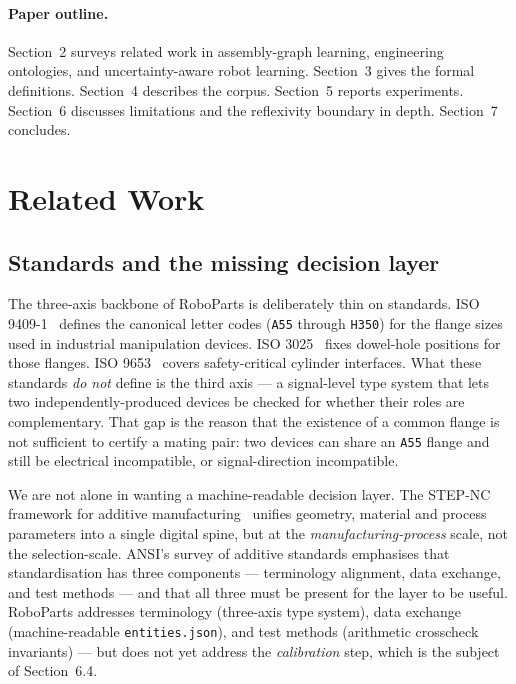 \documentclass[review]{elsarticle}
\begin{document}
\paragraph{Paper outline.}
Section~2 surveys related work in assembly-graph learning, engineering
ontologies, and uncertainty-aware robot learning. Section~3 gives the
formal definitions. Section~4 describes the corpus. Section~5 reports
experiments. Section~6 discusses limitations and the reflexivity
boundary in depth. Section~7 concludes.

\section{Related Work}

\subsection{Standards and the missing decision layer}

The three-axis backbone of RoboParts is deliberately thin on standards.
\textsc{ISO 9409-1}~\cite{iso9409} defines the canonical letter codes
(\texttt{A55} through \texttt{H350}) for the flange sizes used in
industrial manipulation devices. \textsc{ISO 3025}~\cite{iso3025}
fixes dowel-hole positions for those flanges. \textsc{ISO 9653}~\cite{iso9653}
covers safety-critical cylinder interfaces. What these standards
\emph{do not} define is the third axis — a signal-level type system
that lets two independently-produced devices be checked for whether
their roles are complementary. That gap is the reason that the
existence of a common flange is not sufficient to certify a mating
pair: two devices can share an \texttt{A55} flange and still be
electrical incompatible, or signal-direction incompatible.

We are not alone in wanting a machine-readable decision layer. The
\textsc{STEP-NC} framework for additive manufacturing~\cite{R12}
unifies geometry, material and process parameters into a single
digital spine, but at the \emph{manufacturing-process} scale, not the
selection-scale. \textsc{ANSI}'s survey of additive standards
\cite{R13} emphasises that standardisation has three components —
terminology alignment, data exchange, and test methods — and
that all three must be present for the layer to be useful. RoboParts
addresses terminology (three-axis type system), data exchange
(machine-readable \texttt{entities.json}), and test methods
(arithmetic crosscheck invariants) — but does not yet address the
\emph{calibration} step, which is the subject of Section~6.4.
\end{document}
